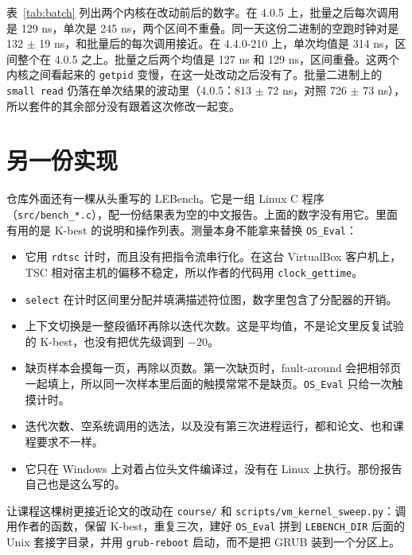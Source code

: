 \documentclass[11pt,fontset=none]{ctexart}
\begin{document}
\begin{table}[ht]
\centering
\caption{三次 K-best 的均值 $\pm$ 样本标准差。单次一列来自精简扫描，批量一列是上面这一处改动。}
\label{tab:batch}

\end{table}

表~\ref{tab:batch} 列出两个内核在改动前后的数字。在 4.0.5 上，批量之后每次调用是 129 ns，单次是 245 ns，两个区间不重叠。同一天这份二进制的空跑时钟对是 132 $\pm$ 19 ns，和批量后的每次调用接近。在 4.4.0-210 上，单次均值是 314 ns，区间整个在 4.0.5 之上。批量之后两个均值是 127 ns 和 129 ns，区间重叠。这两个内核之间看起来的 \texttt{getpid} 变慢，在这一处改动之后没有了。批量二进制上的 \texttt{small read} 仍落在单次结果的波动里（4.0.5：813 $\pm$ 72 ns，对照 726 $\pm$ 73 ns），所以套件的其余部分没有跟着这次修改一起变。

\section{另一份实现}
\label{sec:rewrite}

仓库外面还有一棵从头重写的 LEBench。它是一组 Linux C 程序（\texttt{src/bench\_*.c}），配一份结果表为空的中文报告。上面的数字没有用它。里面有用的是 K-best 的说明和操作列表。测量本身不能拿来替换 \texttt{OS\_Eval}：

\begin{itemize}
\item 它用 \texttt{rdtsc} 计时，而且没有把指令流串行化。在这台 VirtualBox 客户机上，TSC 相对宿主机的偏移不稳定，所以作者的代码用 \texttt{clock\_gettime}。
\item \texttt{select} 在计时区间里分配并填满描述符位图，数字里包含了分配器的开销。
\item 上下文切换是一整段循环再除以迭代次数。这是平均值，不是论文里反复试验的 K-best，也没有把优先级调到 $-20$。
\item 缺页样本会摸每一页，再除以页数。第一次缺页时，fault-around 会把相邻页一起填上，所以同一次样本里后面的触摸常常不是缺页。\texttt{OS\_Eval} 只给一次触摸计时。
\item 迭代次数、空系统调用的选法，以及没有第三次进程运行，都和论文、也和课程要求不一样。
\item 它只在 Windows 上对着占位头文件编译过，没有在 Linux 上执行。那份报告自己也是这么写的。
\end{itemize}

让课程这棵树更接近论文的改动在 \texttt{course/} 和 \texttt{scripts/vm\_kernel\_sweep.py}：调用作者的函数，保留 K-best，重复三次，建好 \texttt{OS\_Eval} 拼到 \texttt{LEBENCH\_DIR} 后面的 Unix 套接字目录，并用 \texttt{grub-reboot} 启动，而不是把 GRUB 装到一个分区上。
\end{document}
